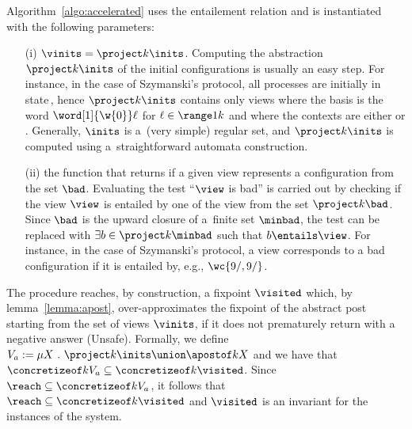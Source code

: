 Algorithm~\ref{algo:accelerated} uses the entailement relation and is
instantiated with the following parameters: %
\begin{enumerate}
\item[(i)]%
  $\vinits = \project k {\inits}$. %
  Computing the abstraction $\project k \inits$ of the initial
  configurations is usually an easy step. %
  For instance, in the case of Szymanski's protocol, all processes are
  initially in state\,, hence $\project k \inits$ contains
  only views where the basis is the word $\word[1]{\w{0}} \ell$
  for $\ell\in\range 1 k$ and where the contexts are either \wc[]{}
  or \wc[0]{}. %
  Generally, $\inits$ is a~(very simple) regular set, and $\project k
  \inits$ is computed using a~straightforward automata construction.
\item[(ii)]%
  the function that returns if a given view represents a configuration from the set $\bad$.
  Evaluating the test ``$\view$ is bad'' is carried out by checking if the view $\view$ is entailed by one of
  the view from the set $\project k {\bad}$.
  Since $\bad$ is the upward closure of a~finite set $\minbad$, the
  test can be replaced with $\exists b\in\project k \minbad$ such that
  $b\entails\view$.
  For instance, in the case of Szymanski's protocol, a view
  corresponds to a bad configuration if it is entailed by, e.g., 
  $\wc{9/,9/}$.
\end{enumerate}

The procedure reaches, by construction, a fixpoint $\visited$ which,
by lemma~\ref{lemma:apost}, over-approximates the fixpoint of the
abstract post starting from the set of views $\vinits$, if it does not
prematurely return with a negative answer (Unsafe). %
%
Formally, we define $V_a := \mu X~.~\project k \inits \union \apostof
k X$ and we have that %
$\concretizeof k {V_a} \subseteq \concretizeof k \visited$.
%	
Since $\reach \subseteq \concretizeof k {V_a}$, it follows that %
$\reach \subseteq \concretizeof k \visited$ and $\visited$ is an
invariant for the instances of the system.%
%

